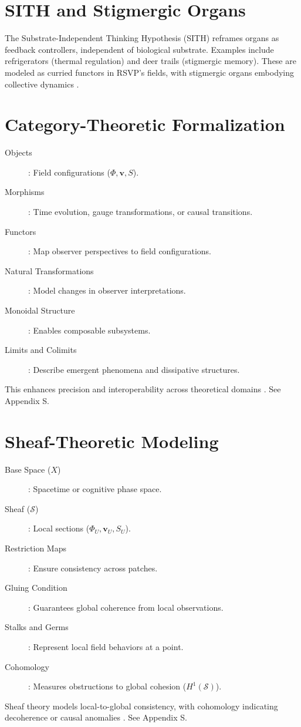 \documentclass[12pt]{report}
\newcommand{\PhiRSVP}{\Phi}
\newcommand{\vRSVP}{\mathbf{v}}
\newcommand{\SRSVP}{S}
\begin{document}
\section{SITH and Stigmergic Organs}
The Substrate-Independent Thinking Hypothesis (SITH) reframes organs as feedback controllers, independent of biological substrate. Examples include refrigerators (thermal regulation) and deer trails (stigmergic memory). These are modeled as curried functors in RSVP’s fields, with stigmergic organs embodying collective dynamics \citep{SocioeconomicFunctors2025}.

\section{Category-Theoretic Formalization}
\begin{description}
    \item[Objects]: Field configurations (\(\PhiRSVP, \vRSVP, \SRSVP\)).
    \item[Morphisms]: Time evolution, gauge transformations, or causal transitions.
    \item[Functors]: Map observer perspectives to field configurations.
    \item[Natural Transformations]: Model changes in observer interpretations.
    \item[Monoidal Structure]: Enables composable subsystems.
    \item[Limits and Colimits]: Describe emergent phenomena and dissipative structures.
\end{description}
This enhances precision and interoperability across theoretical domains \citep{Lurie2009}. See Appendix S.

\section{Sheaf-Theoretic Modeling}
\begin{description}
    \item[Base Space (\(X\))]: Spacetime or cognitive phase space.
    \item[Sheaf (\(\mathcal{S}\))]: Local sections (\(\PhiRSVP_U, \vRSVP_U, \SRSVP_U\)).
    \item[Restriction Maps]: Ensure consistency across patches.
    \item[Gluing Condition]: Guarantees global coherence from local observations.
    \item[Stalks and Germs]: Represent local field behaviors at a point.
    \item[Cohomology]: Measures obstructions to global cohesion (\(H^1(\mathcal{S})\)).
\end{description}
Sheaf theory models local-to-global consistency, with cohomology indicating decoherence or causal anomalies \citep{Bredon1997}. See Appendix S.
\end{document}
